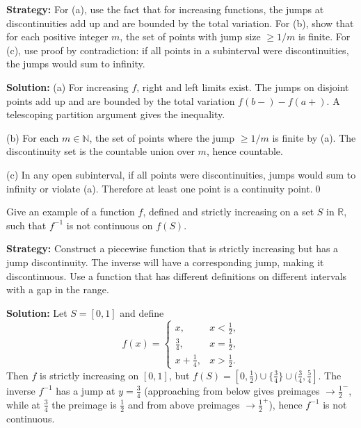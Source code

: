 \noindent\textbf{Strategy:} For (a), use the fact that for increasing functions, the jumps at discontinuities add up and are bounded by the total variation. For (b), show that for each positive integer $m$, the set of points with jump size $\geq 1/m$ is finite. For (c), use proof by contradiction: if all points in a subinterval were discontinuities, the jumps would sum to infinity.

\bigskip\noindent\textbf{Solution:}
(a) For increasing $f$, right and left limits exist. The jumps on disjoint points add up and are bounded by the total variation $f(b-)-f(a+)$. A telescoping partition argument gives the inequality.

(b) For each $m\in\mathbb{N}$, the set of points where the jump $\ge 1/m$ is finite by (a). The discontinuity set is the countable union over $m$, hence countable.

(c) In any open subinterval, if all points were discontinuities, jumps would sum to infinity or violate (a). Therefore at least one point is a continuity point.\qed



\begin{problembox}
\begin{problemstatement}
Give an example of a function $f$, defined and strictly increasing on a set $S$ in $\mathbb{R}$, such that $f^{-1}$ is not continuous on $f(S)$.
\end{problemstatement}
\end{problembox}

\noindent\textbf{Strategy:} Construct a piecewise function that is strictly increasing but has a jump discontinuity. The inverse will have a corresponding jump, making it discontinuous. Use a function that has different definitions on different intervals with a gap in the range.

\bigskip\noindent\textbf{Solution:}
Let $S=[0,1]$ and define
\[
f(x)=\begin{cases}
x,& x<\tfrac12,\\
\tfrac34,& x=\tfrac12,\\
x+\tfrac14,& x>\tfrac12.
\end{cases}
\]
Then $f$ is strictly increasing on $[0,1]$, but $f(S)=[0,\tfrac12)\cup\{\tfrac34\}\cup(\tfrac34,\tfrac54]$. The inverse $f^{-1}$ has a jump at $y=\tfrac34$ (approaching from below gives preimages $\to\tfrac12^-$, while at $\tfrac34$ the preimage is $\tfrac12$ and from above preimages $\to\tfrac12^+$), hence $f^{-1}$ is not continuous.

